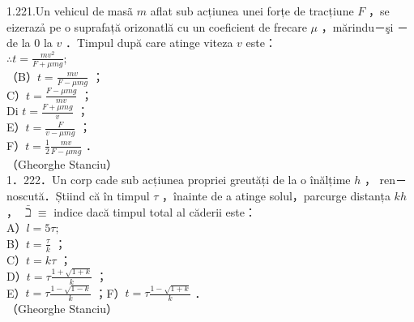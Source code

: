 {1.221.Un vehicul de masã $m$ aflat sub acțiunea unei forțe de tracțiune $F$ ，se eizerazả pe o suprafață orizonatlă cu un coeficient de frecare $\mu$ ，mărindu－şi －de la 0 la $v$ ．Timpul după care atinge viteza $v$ este：\\
$\therefore t=\frac{m v^{2}}{F+\mu m g} ;$\\
（B）$t=\frac{m v}{F-\mu m g}$ ；\\
C）$t=\frac{F-\mu m g}{m v}$ ；\\
Di $t=\frac{F+\mu m g}{v}$ ；\\
E）$t=\frac{F}{v-\mu m g}$ ；\\
F）$t=\frac{1}{2} \frac{m v}{F-\mu m g}$ ．\\
（Gheorghe Stanciu）\\
1．222．Un corp cade sub acțiunea propriei greutăți de la o înălțime $h$ ， ren－noscută．Știind că în timpul $\tau$ ，înainte de a atinge solul，parcurge distanța $k h$ ， $\bar{\beth} \equiv$ indice dacă timpul total al căderii este：\\
A）$l=5 \tau ;$\\
B）$t=\frac{\tau}{k}$ ；\\
C）$t=k \tau$ ；\\
D）$t=\tau \frac{1+\sqrt{1+k}}{k}$ ；\\
E）$t=\tau \frac{1-\sqrt{1-k}}{k}$ ；F）$t=\tau \frac{1-\sqrt{1+k}}{k}$ ．\\
（Gheorghe Stanciu）

}
